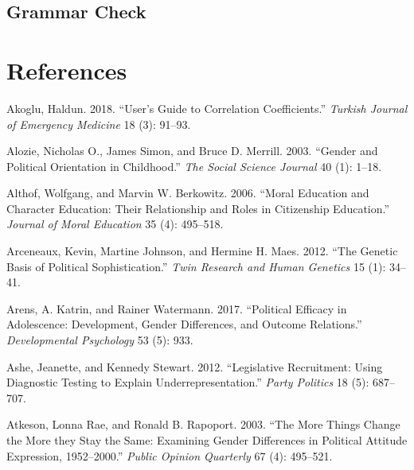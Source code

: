 \documentclass[
  letterpaper,
  DIV=11,
  numbers=noendperiod]{scrreprt}
\newlength{\cslhangindent}
\newenvironment{CSLReferences}[2] %
 {\begin{list}{}{%
  \setlength{\itemindent}{0pt}
  \setlength{\leftmargin}{0pt}
  \setlength{\parsep}{0pt}
  \ifodd #1
   \setlength{\leftmargin}{\cslhangindent}
   \setlength{\itemindent}{-1\cslhangindent}
  \fi
  \setlength{\itemsep}{#2\baselineskip}}}
 {\end{list}}
\begin{document}
\section{Grammar Check}\label{grammar-check}


\chapter*{References}\label{references}


\label{refs}
\begin{CSLReferences}{1}{0}
Akoglu, Haldun. 2018. {``{User's Guide to Correlation Coefficients}.''}
\emph{{Turkish Journal of Emergency Medicine}} 18 (3): 91--93.

Alozie, Nicholas O., James Simon, and Bruce D. Merrill. 2003. {``{Gender
and Political Orientation in Childhood}.''} \emph{The Social Science
Journal} 40 (1): 1--18.

Althof, Wolfgang, and Marvin W. Berkowitz. 2006. {``{Moral Education and
Character Education: Their Relationship and Roles in Citizenship
Education}.''} \emph{Journal of Moral Education} 35 (4): 495--518.

Arceneaux, Kevin, Martine Johnson, and Hermine H. Maes. 2012. {``{The
Genetic Basis of Political Sophistication}.''} \emph{Twin Research and
Human Genetics} 15 (1): 34--41.

Arens, A. Katrin, and Rainer Watermann. 2017. {``{Political Efficacy in
Adolescence: Development, Gender Differences, and Outcome Relations}.''}
\emph{Developmental Psychology} 53 (5): 933.

Ashe, Jeanette, and Kennedy Stewart. 2012. {``{Legislative Recruitment:
Using Diagnostic Testing to Explain Underrepresentation}.''} \emph{Party
Politics} 18 (5): 687--707.

Atkeson, Lonna Rae, and Ronald B. Rapoport. 2003. {``{The More Things
Change the More they Stay the Same: Examining Gender Differences in
Political Attitude Expression, 1952--2000}.''} \emph{Public Opinion
Quarterly} 67 (4): 495--521.


\end{CSLReferences}
\end{document}
